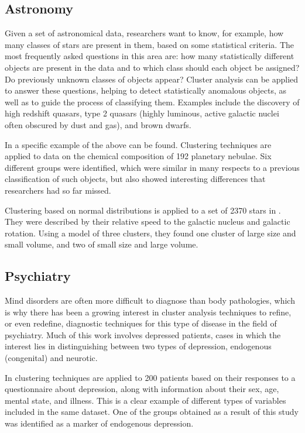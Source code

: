 \subsection{Astronomy}

Given a set of astronomical data, researchers want to know, for example, how many classes of stars are present in them, based on some statistical criteria. The most frequently asked questions in this area are: how many statistically different objects are present in the data and to which class should each object be assigned? Do previously unknown classes of objects appear? Cluster analysis can be applied to answer these questions, helping to detect statistically anomalous objects, as well as to guide the process of classifying them. Examples include the discovery of high redshift quasars, type 2 quasars (highly luminous, active galactic nuclei often obscured by dust and gas), and brown dwarfs.

In \cite{faundez1996classification} a specific example of the above can be found. Clustering techniques are applied to data on the chemical composition of 192 planetary nebulae. Six different groups were identified, which were similar in many respects to a previous classification of such objects, but also showed interesting differences that researchers had so far missed.

Clustering based on normal distributions is applied to a set of 2370 stars in \cite{celeux1992classification}. They were described by their relative speed to the galactic nucleus and galactic rotation. Using a model of three clusters, they found one cluster of large size and small volume, and two of small size and large volume.

\subsection{Psychiatry}

Mind disorders are often more difficult to diagnose than body pathologies, which is why there has been a growing interest in cluster analysis techniques to refine, or even redefine, diagnostic techniques for this type of disease in the field of psychiatry. Much of this work involves depressed patients, cases in which the interest lies in distinguishing between two types of depression, endogenous (congenital) and neurotic.

In \cite{pledger2008using} clustering techniques are applied to 200 patients based on their responses to a questionnaire about depression, along with information about their sex, age, mental state, and illness. This is a clear example of different types of variables included in the same dataset. One of the groups obtained as a result of this study was identified as a marker of endogenous depression.


